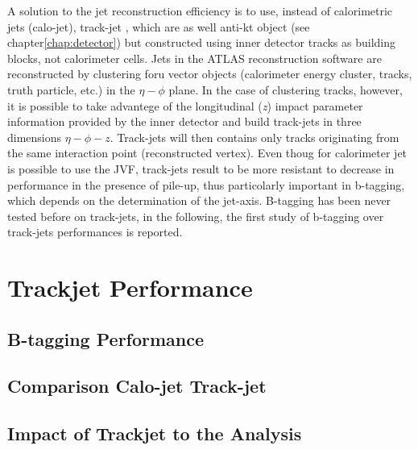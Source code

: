 A solution to the jet reconstruction efficiency is to use, instead of calorimetric jets (calo-jet), track-jet , which are as well
anti-kt object (see chapter\ref{chap:detector}) but constructed using inner detector tracks as building blocks, not calorimeter cells.
Jets in the ATLAS reconstruction software are reconstructed by clustering foru vector objects (calorimeter energy cluster, tracks, 
truth particle, etc.) in the $\eta - \phi$ plane. In the case of clustering tracks, however, it is possible to take advantege of
the longitudinal (\emph{z}) impact parameter information provided by the inner detector and build track-jets in three dimensions 
$\eta - \phi - z$. Track-jets will then contains only tracks originating from the same interaction point (reconstructed vertex).
Even thoug for calorimeter jet is possible to use the JVF, track-jets result to be more resistant to decrease in performance in the
presence of pile-up, thus particolarly important in b-tagging, which depends on the determination of the jet-axis. 
B-tagging has been never tested before on track-jets, in the following, the first study of b-tagging over track-jets performances is reported. 








\section{Trackjet Performance}
\subsection{B-tagging Performance}
\subsection{Comparison Calo-jet Track-jet}
\subsection{Impact of Trackjet to the Analysis} %

